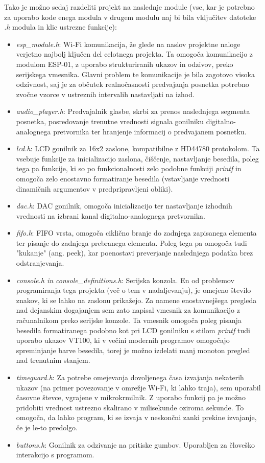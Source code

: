 \documentclass[12pt,a4paper,twoside,openright,slovene]{book}
\begin{document}
Tako je možno sedaj razdeliti projekt na naslednje module (vse, kar je potrebno za uporabo kode enega modula v drugem modulu naj bi bila vključitev datoteke \textit{.h} modula in klic ustrezne funkcije):
\begin{itemize}
\item \textit{esp\_module.h}: Wi-Fi komunikacija, že glede na naslov projektne naloge verjetno najbolj ključen del celotnega projekta. Ta omogoča komunikacijo z modulom ESP-01, z uporabo strukturiranih ukazov in odzivov, preko serijskega vmesnika. Glavni problem te komunikacije je bila zagotovo visoka odzivnost, saj je za občutek realnočasnosti predvajanja posnetka potrebno zvočne vzorce v ustreznih intervalih nastavljati na izhod.
\item \textit{audio\_player.h}: Predvajalnik glasbe, skrbi za prenos naslednjega segmenta posnetka, posredovanje trenutne vrednosti signala gonilniku digitalno-analognega pretvornika ter hranjenje informacij o predvajanem posnetku.
\item \textit{lcd.h}: LCD gonilnik za 16x2 zaslone, kompatibilne z HD44780 protokolom. Ta vsebuje funkcije za inicializacijo zaslona, čiščenje, nastavljanje besedila, poleg tega pa funkcije, ki so po funkcionalnosti zelo podobne funkciji \textit{printf} in omogoča zelo enostavno formatiranje besedila (vstavljanje vrednosti dinamičnih argumentov v predpripravljeni obliki).
\item \textit{dac.h}: DAC gonilnik, omogoča inicializacijo ter nastavljanje izhodnih vrednosti na izbrani kanal digitalno-analognega pretvornika.
\item \textit{fifo.h}: FIFO vrsta, omogoča ciklično branje do zadnjega zapisanega elementa ter pisanje do zadnjega prebranega elementa. Poleg tega pa omogoča tudi "kukanje" (ang. peek), kar poenostavi preverjanje naslednjega podatka brez odstranjevanja.
\item \textit{console.h in console\_definitions.h}: Serijska konzola. En od problemov programiranja tega projekta (več o tem v nadaljevanju), je omejeno število znakov, ki se lahko na zaslonu prikažejo. Za namene enostavnejšega pregleda nad dejanskim dogajanjem sem zato napisal vmesnik za komunikacijo z računalnikom preko serijske konzole. Ta vmesnik omogoča poleg pisanja besedila formatiranega podobno kot pri LCD gonilniku s stilom \textit{printf} tudi uporabo ukazov VT100, ki v večini modernih programov omogočajo spreminjanje barve besedila, torej je možno izdelati manj monoton pregled nad trenutnim stanjem.
\item \textit{timeguard.h}: Za potrebe omejevanja dovoljenega časa izvajanja nekaterih ukazov (na primer povezovanje v omrežje Wi-Fi, ki lahko traja), sem uporabil časovne števce, vgrajene v mikrokrmilnik. Z uporabo funkcij pa je možno pridobiti vrednost ustrezno skalirano v milisekunde oziroma sekunde. To omogoča, da lahko program, ki se izvaja v neskončni zanki prekine izvajanje, če je le-to predolgo.
\item \textit{buttons.h}: Gonilnik za odzivanje na pritiske gumbov. Uporabljen za človeško interakcijo s programom.
\end{itemize}
\end{document}
